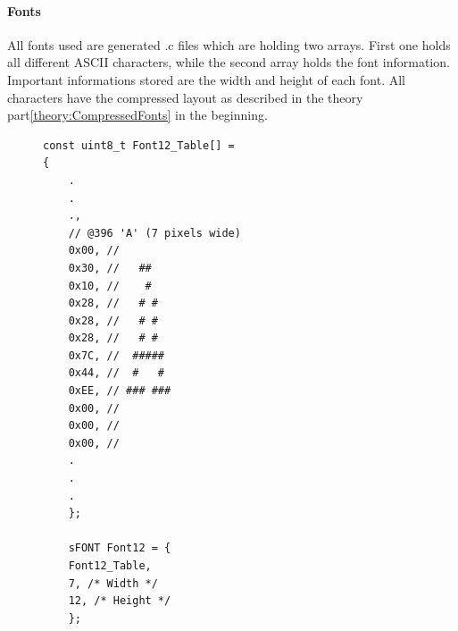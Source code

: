 \paragraph{Fonts}
All fonts used are generated .c files which are holding two arrays. First one holds all different ASCII characters, while the second array holds the font information. Important informations stored are the width and height of each font. All characters have the compressed layout as described in the theory part\ref{theory:CompressedFonts} in the beginning.
\begin{figure}[H]
	\begin{lstlisting}
const uint8_t Font12_Table[] = 
{
	.
	.
	.,
	// @396 'A' (7 pixels wide)
	0x00, //        
	0x30, //   ##   
	0x10, //    #   
	0x28, //   # #  
	0x28, //   # #  
	0x28, //   # #  
	0x7C, //  ##### 
	0x44, //  #   # 
	0xEE, // ### ###
	0x00, //        
	0x00, //        
	0x00, // 
	.
	.
	. 
	};
	
	sFONT Font12 = {
	Font12_Table,
	7, /* Width */
	12, /* Height */
	};
	\end{lstlisting}
\end{figure}

